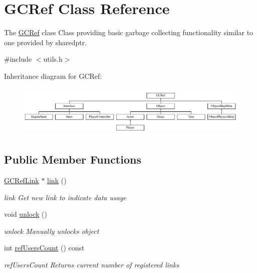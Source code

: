 \hypertarget{classGCRef}{}\section{G\+C\+Ref Class Reference}
\label{classGCRef}


The \hyperlink{classGCRef}{G\+C\+Ref} class Class providing basic garbage collecting functionality similar to one provided by sharedptr.  




{\ttfamily \#include $<$utils.\+h$>$}

Inheritance diagram for G\+C\+Ref\+:\begin{figure}[H]
\begin{center}
\leavevmode
\includegraphics[height=2.480620cm]{classGCRef}
\end{center}
\end{figure}
\subsection*{Public Member Functions}
\begin{DoxyCompactItemize}
\item 
\hyperlink{classGCRefLink}{G\+C\+Ref\+Link} $\ast$ \hyperlink{classGCRef_ae39bea73b9c6af4a0df6ff490f3e8fa9}{link} ()
\begin{DoxyCompactList}\small\item\em link Get new link to indicate data usage \end{DoxyCompactList}\item 
\hypertarget{classGCRef_a7d1570b675959b895736d490d5998269}{}void \hyperlink{classGCRef_a7d1570b675959b895736d490d5998269}{unlock} ()\label{classGCRef_a7d1570b675959b895736d490d5998269}

\begin{DoxyCompactList}\small\item\em unlock Manually unlocks object \end{DoxyCompactList}\item 
int \hyperlink{classGCRef_a7cc24acd7029926613e9681e16f2bf76}{ref\+Users\+Count} () const 
\begin{DoxyCompactList}\small\item\em ref\+Users\+Count Returns current number of registered links \end{DoxyCompactList}\end{DoxyCompactItemize}
